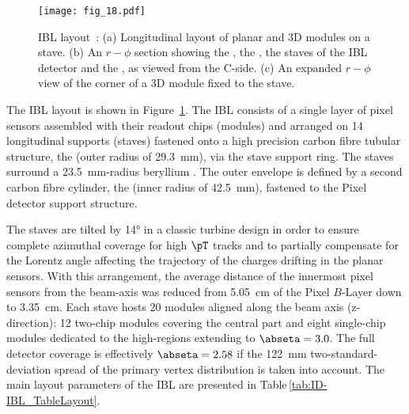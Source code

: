 \documentclass[cernpreprint, atlasdraft=false, UKenglish,british,orcidlogo, texmf, orcidlogo]{atlasdoc}
\begin{document}
\begin{figure}
\centering
\texttt{[image: fig\_18.pdf]}
\caption{\gls{IBL} layout~\cite{PIX-2018-001}: (a) Longitudinal layout of planar and 3D modules on a stave. (b) An $r-\phi$ section showing the \beampipe, the , the staves of the \gls{IBL} detector and the , as viewed from the C-side. (c)  An expanded $r-\phi$ view of the corner of a 3D module fixed to the stave.}
\label{fig:ID-IBL_Layouts}
\end{figure}
 
The \gls{IBL} layout is shown in Figure~\ref{fig:ID-IBL_Layouts}. The \gls{IBL} consists of a single layer of pixel sensors assembled with their readout chips (modules) and arranged on \num{14} longitudinal supports (staves) fastened onto a high precision carbon fibre tubular structure, the  (outer radius of \SI{29.3}{\mm}), via the stave support ring. The staves surround a \SI{23.5}{\mm}-radius beryllium \beampipe. The outer envelope is defined by a second carbon fibre cylinder, the  (inner radius of \SI{42.5}{\mm}), fastened to the Pixel detector support structure.
 
The staves are tilted by \ang{14} in a classic turbine design in order to ensure complete azimuthal coverage for high $\pT$ tracks and to partially compensate for the Lorentz angle affecting the trajectory of the charges drifting in the planar sensors. With this arrangement, the average distance of the innermost pixel sensors from the beam-axis was reduced from \SI{5.05}{\cm} of the Pixel $B$-Layer down to \SI{3.35}{\cm}. Each stave hosts \num{20} modules aligned along the beam axis (z-direction): \num{12} two-chip modules covering the central part and eight single-chip modules dedicated to the high-\abseta regions extending to $\abseta=3.0$. The full detector coverage is effectively $\abseta=2.58$ if the \SI{122}{\mm} two-standard-deviation spread of the primary vertex distribution is taken into account. The main layout parameters of the IBL are presented in Table\,\ref{tab:ID-IBL_TableLayout}.
 
\end{document}
